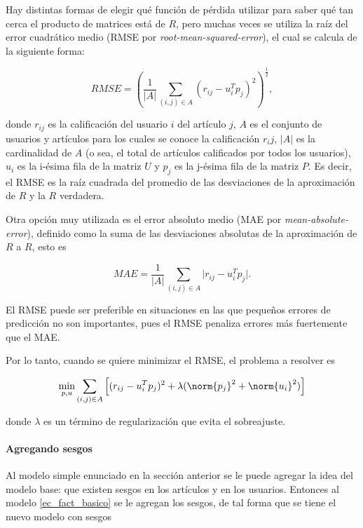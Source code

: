 Hay distintas formas de elegir qué función de pérdida utilizar para saber qué tan cerca el producto de matrices está de $R$, pero muchas veces se utiliza la raíz del error cuadrático medio (RMSE por \textit{root-mean-squared-error}), el cual se calcula de la siguiente forma:

\begin{equation}
  \label{ec:rmse}
  RMSE = \left ( \frac{1}{\vert A \vert} \sum_{(i,j) \in A} (r_{ij} - u_i^Tp_j )^2 \right ) ^ \frac{1}{2},
\end{equation}

donde $r_{ij}$ es la calificación del usuario $i$ del artículo $j$, $A$ es el conjunto de usuarios y artículos para los cuales se conoce la calificación $r_ij$, $ \vert A \vert$ es la cardinalidad de $A$ (o sea, el total de artículos calificados por todos los usuarios), $u_i$ es la i-ésima fila de la matriz $U$ y $p_j$ es la j-ésima fila de la matriz $P$. Es decir, el RMSE es la raíz cuadrada del promedio de las desviaciones de la aproximación de $R$ y la $R$ verdadera. 

Otra opción muy utilizada es el error absoluto medio (MAE por \textit{mean-absolute-error}), definido como la suma de las desviaciones absolutas de la aproximación de $R$ a $R$, esto es

\[
MAE = \frac{1}{\vert A \vert} \sum_{(i,j) \in A} \vert r_{ij} - u_i^Tp_j \vert.
\]

El RMSE puede ser preferible en situaciones en las que pequeños errores de predicción no son importantes, pues el RMSE penaliza errores más fuertemente que el MAE.

Por lo tanto, cuando se quiere minimizar el RMSE, el problema a resolver es

\begin{equation}
\min_{p, u} \sum_{(i,j) \in A} \left [ (r_{ij} - u_i^Tp_j )^2 + \lambda ( \norm{p_j}^2 + \norm{u_i}^2 ) \right ]
\end{equation}

donde $\lambda$ es un término de regularización que evita el sobreajuste.

\paragraph{Agregando sesgos}

Al modelo simple enunciado en la sección anterior se le puede agregar la idea del modelo base: que existen sesgos en los artículos y en los usuarios. Entonces al modelo \ref{ec_fact_basico} se le agregan los sesgos, de tal forma que se tiene el nuevo modelo con sesgos

